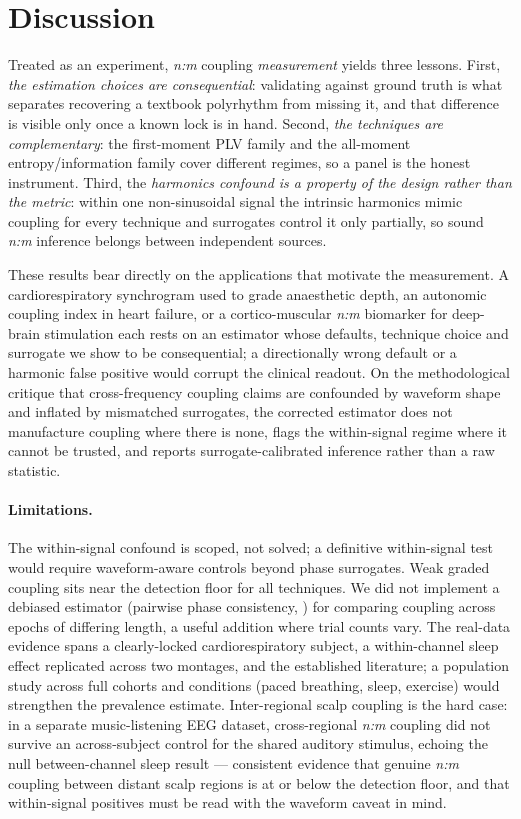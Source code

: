 \documentclass[11pt]{article}
\begin{document}
\section{Discussion}

Treated as an experiment, \textit{n:m} coupling \emph{measurement} yields three lessons. First, \emph{the
estimation choices are consequential}: validating against ground truth is what separates recovering a
textbook polyrhythm from missing it, and that difference is visible only once a known lock is in hand.
Second, \emph{the techniques are complementary}: the first-moment PLV family and the all-moment
entropy/information family cover different regimes, so a panel is the honest instrument. Third, the
\emph{harmonics confound is a property of the design rather than the metric}: within one non-sinusoidal
signal the intrinsic harmonics mimic coupling for every technique and surrogates control it only
partially, so sound \textit{n:m} inference belongs between independent sources.

These results bear directly on the applications that motivate the measurement. A cardiorespiratory
synchrogram used to grade anaesthetic depth, an autonomic coupling index in heart failure, or a
cortico-muscular \textit{n:m} biomarker for deep-brain stimulation each rests on an estimator whose
defaults, technique choice and surrogate we show to be consequential; a directionally wrong default or a
harmonic false positive would corrupt the clinical readout. On the methodological critique that
cross-frequency coupling claims are confounded by waveform shape and inflated by mismatched surrogates,
the corrected estimator does not manufacture coupling where there is none, flags the within-signal regime
where it cannot be trusted, and reports surrogate-calibrated inference rather than a raw statistic.

\paragraph{Limitations.} The within-signal confound is scoped, not solved; a definitive within-signal test
would require waveform-aware controls beyond phase surrogates. Weak graded coupling sits near the
detection floor for all techniques. We did not implement a debiased estimator (pairwise phase consistency, \citealp{vinck2010})
for comparing coupling across epochs of differing length, a useful addition where trial counts vary. The
real-data evidence spans a clearly-locked cardiorespiratory subject, a within-channel sleep effect
replicated across two montages, and the established literature; a population study across full cohorts and
conditions (paced breathing, sleep, exercise) would strengthen the prevalence estimate. Inter-regional
scalp coupling is the hard case: in a separate music-listening EEG dataset, cross-regional \textit{n:m}
coupling did not survive an across-subject control for the shared auditory stimulus, echoing the null
between-channel sleep result --- consistent evidence that genuine \textit{n:m} coupling between distant
scalp regions is at or below the detection floor, and that within-signal positives must be read with the
waveform caveat in mind.
\end{document}
